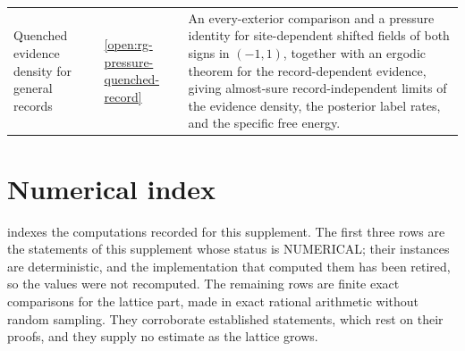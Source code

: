 {\begin{longtable}{@{}>{\raggedright\arraybackslash}p{}
>{\raggedright\arraybackslash}p{}
>{\raggedright\arraybackslash}p{}@{}}
Quenched evidence density for general records & \cref{open:rg-pressure-quenched-record} & An every-exterior comparison and a pressure identity for site-dependent shifted fields of both signs in $(-1,1)$, together with an ergodic theorem for the record-dependent evidence, giving almost-sure record-independent limits of the evidence density, the posterior label rates, and the specific free energy. \\
\end{longtable}
}

\section{Numerical index}
\label{sec:rg-thermo-numerical-provenance}

 indexes the computations recorded for this supplement. The first three rows
are the statements of this supplement whose status is NUMERICAL; their instances are deterministic,
and the implementation that computed them has been retired, so the values were not recomputed. The
remaining rows are finite exact comparisons for the lattice part, made in exact
rational arithmetic without random sampling. They corroborate established statements, which rest on
their proofs, and they supply no estimate as the lattice grows.

